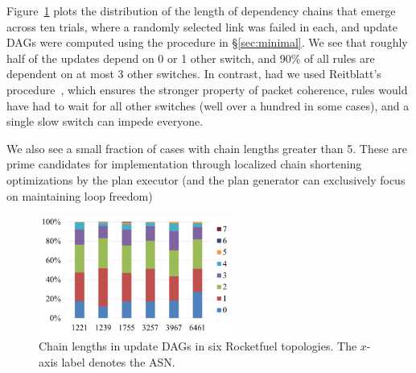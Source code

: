 Figure~\ref{fig:as} plots the distribution of the length of dependency chains that emerge across ten trials, where a randomly selected link was failed in each, and update DAGs were computed using the procedure in \S\ref{sec:minimal}. We see that roughly half of the updates depend on 0 or 1 other switch, and 90\% of all rules are dependent on at most 3 other switches. In contrast, had we used Reitblatt's procedure~\cite{safeupdate}, which ensures the stronger property of packet coherence, rules would have had to wait for all other switches (well over a hundred in some cases), and a single slow switch can impede everyone.

We also see a small fraction of cases with chain lengths greater than 5. These are prime candidates for implementation through localized chain shortening optimizations by the plan executor (and the plan generator can exclusively focus on maintaining loop freedom)


\begin{figure}[t!]
  \centering
  \includegraphics[width=2.5in]{figures/as.png}
  \vspace{-10pt}
  \caption{Chain lengths in update DAGs in six Rocketfuel topologies. The $x$-axis label denotes the ASN.}\label{fig:as}
\end{figure}

